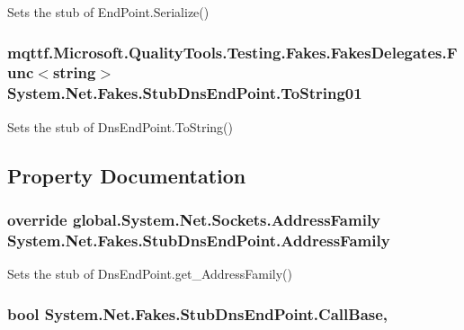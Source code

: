 Sets the stub of End\-Point.\-Serialize()

\hypertarget{class_system_1_1_net_1_1_fakes_1_1_stub_dns_end_point_ab1aa4ba3b0dcf3e86c810fd828ec7229}{
\subsubsection[{To\-String01}]{\setlength{\rightskip}{0pt plus 5cm}mqttf.\-Microsoft.\-Quality\-Tools.\-Testing.\-Fakes.\-Fakes\-Delegates.\-Func$<$string$>$ System.\-Net.\-Fakes.\-Stub\-Dns\-End\-Point.\-To\-String01}}\label{class_system_1_1_net_1_1_fakes_1_1_stub_dns_end_point_ab1aa4ba3b0dcf3e86c810fd828ec7229}


Sets the stub of Dns\-End\-Point.\-To\-String()



\subsection{Property Documentation}
\hypertarget{class_system_1_1_net_1_1_fakes_1_1_stub_dns_end_point_a1037a56a4e010687b9720da1cf77c124}{
\subsubsection[{Address\-Family}]{\setlength{\rightskip}{0pt plus 5cm}override global.\-System.\-Net.\-Sockets.\-Address\-Family System.\-Net.\-Fakes.\-Stub\-Dns\-End\-Point.\-Address\-Family\hspace{0.3cm}{\ttfamily [get]}}}\label{class_system_1_1_net_1_1_fakes_1_1_stub_dns_end_point_a1037a56a4e010687b9720da1cf77c124}


Sets the stub of Dns\-End\-Point.\-get\-\_\-\-Address\-Family()

\hypertarget{class_system_1_1_net_1_1_fakes_1_1_stub_dns_end_point_a88ec14c4dd756bd77f632edf4791f29b}{
\subsubsection[{Call\-Base}]{\setlength{\rightskip}{0pt plus 5cm}bool System.\-Net.\-Fakes.\-Stub\-Dns\-End\-Point.\-Call\-Base\hspace{0.3cm}{\ttfamily [get]}, {\ttfamily [set]}}}\label{class_system_1_1_net_1_1_fakes_1_1_stub_dns_end_point_a88ec14c4dd756bd77f632edf4791f29b}


